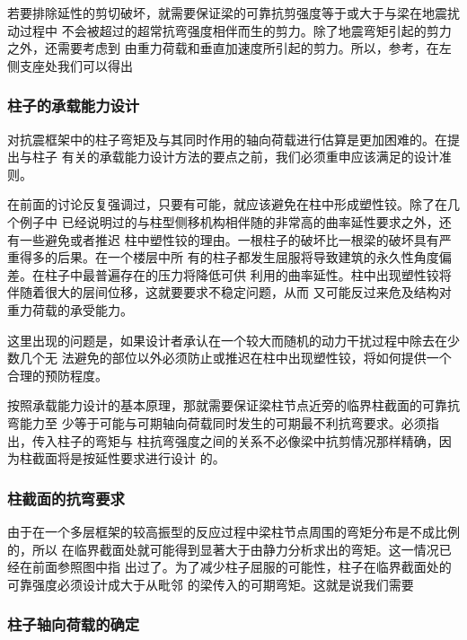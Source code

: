 \documentclass[12pt,a4paper]{book}
\begin{document}
若要排除延性的剪切破坏，就需要保证梁的可靠抗剪强度等于或大于与梁在地震扰动过程中
不会被超过的超常抗弯强度相伴而生的剪力。除了地震弯矩引起的剪力之外，还需要考虑到
由重力荷载和垂直加速度所引起的剪力。所以，参考，在左侧支座处我们可以得出

\subsubsection{柱子的承载能力设计}

对抗震框架中的柱子弯矩及与其同时作用的轴向荷载进行估算是更加困难的。在提出与柱子
有关的承载能力设计方法的要点之前，我们必须重申应该满足的设计准则。

在前面的讨论反复强调过，只要有可能，就应该避免在柱中形成塑性铰。除了在几个例子中
已经说明过的与柱型侧移机构相伴随的非常高的曲率延性要求之外，还有一些避免或者推迟
柱中塑性铰的理由。一根柱子的破坏比一根梁的破坏具有严重得多的后果。在一个楼层中所
有的柱子都发生屈服将导致建筑的永久性角度偏差。在柱子中最普遍存在的压力将降低可供
利用的曲率延性。柱中出现塑性铰将伴随着很大的层间位移，这就要要求不稳定问题，从而
又可能反过来危及结构对重力荷载的承受能力。

这里出现的问题是，如果设计者承认在一个较大而随机的动力干扰过程中除去在少数几个无
法避免的部位以外必须防止或推迟在柱中出现塑性铰，将如何提供一个合理的预防程度。

按照承载能力设计的基本原理，那就需要保证梁柱节点近旁的临界柱截面的可靠抗弯能力至
少等于可能与可期轴向荷载同时发生的可期最不利抗弯要求。必须指出，传入柱子的弯矩与
柱抗弯强度之间的关系不必像梁中抗剪情况那样精确，因为柱截面将是按延性要求进行设计
的。

\subsubsection{柱截面的抗弯要求}

由于在一个多层框架的较高振型的反应过程中梁柱节点周围的弯矩分布是不成比例的，所以
在临界截面处就可能得到显著大于由静力分析求出的弯矩。这一情况已经在前面参照图中指
出过了。为了减少柱子屈服的可能性，柱子在临界截面处的可靠强度必须设计成大于从毗邻
的梁传入的可期弯矩。这就是说我们需要

\subsubsection{柱子轴向荷载的确定}
\end{document}
